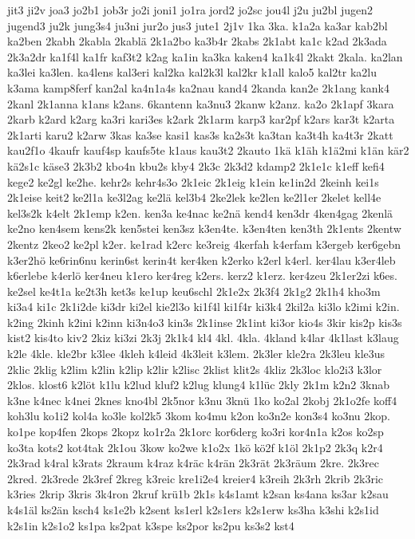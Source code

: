 {jit3
ji2v
joa3
jo2b1
job3r
jo2i
joni1
jo1ra
jord2
jo2sc
jou4l
j2u
ju2bl
jugen2
jugend3
ju2k
jung3s4
ju3ni
jur2o
jus3
jute1
2j1v
1ka
3ka.
k1a2a
ka3ar
kab2bl
ka2ben
2kabh
2kabla
2kablä
2k1a2bo
ka3b4r
2kabs
2k1abt
ka1c
k2ad
2k3ada
2k3a2dr
ka1f4l
ka1fr
kaf3t2
k2ag
ka1in
ka3ka
kaken4
ka1k4l
2kakt
2kala.
ka2lan
ka3lei
ka3len.
ka4lens
kal3eri
kal2ka
kal2k3l
kal2kr
k1all
kalo5
kal2tr
ka2lu
k3ama
kamp8ferf
kan2al
ka4n1a4s
ka2nau
kand4
2kanda
kan2e
2k1ang
kank4
2kanl
2k1anna
k1ans
k2ans.
6kantenn
ka3nu3
2kanw
k2anz.
ka2o
2k1apf
3kara
2karb
k2ard
k2arg
ka3ri
kari3es
k2ark
2k1arm
karp3
kar2pf
k2ars
kar3t
k2arta
2k1arti
karu2
k2arw
3kas
ka3se
kasi1
kas3s
ka2s3t
ka3tan
ka3t4h
ka4t3r
2katt
kau2f1o
4kaufr
kauf4sp
kaufs5te
k1aus
kau3t2
2kauto
1kä
k1äh
k1ä2mi
k1än
kär2
kä2s1c
käse3
2k3b2
kbo4n
kbu2s
kby4
2k3c
2k3d2
kdamp2
2k1e1c
k1eff
kefi4
kege2
ke2gl
ke2he.
kehr2s
kehr4s3o
2k1eic
2k1eig
k1ein
ke1in2d
2keinh
kei1s
2k1eise
keit2
ke2l1a
ke3l2ag
ke2lä
kel3b4
2ke2lek
ke2len
ke2l1er
2kelet
kell4e
kel3s2k
k4elt
2k1emp
k2en.
ken3a
ke4nac
ke2nä
kend4
ken3dr
4ken4gag
2kenlä
ke2no
ken4sem
kens2k
ken5stei
ken3sz
k3en4te.
k3en4ten
ken3th
2k1ents
2kentw
2kentz
2keo2
ke2pl
k2er.
ke1rad
k2erc
ke3reig
4kerfah
k4erfam
k3ergeb
ker6gebn
k3er2hö
ke6rin6nu
kerin6st
kerin4t
ker4ken
k2erko
k2erl
k4erl.
ker4lau
k3er4leb
k6erlebe
k4erlö
ker4neu
k1ero
ker4reg
k2ers.
kerz2
k1erz.
ker4zeu
2k1er2zi
k6es.
ke2sel
ke4t1a
ke2t3h
ket3s
ke1up
keu6schl
2k1e2x
2k3f4
2k1g2
2k1h4
kho3m
ki3a4
ki1c
2k1i2de
ki3dr
ki2el
kie2l3o
ki1f4l
ki1f4r
ki3k4
2kil2a
ki3lo
k2imi
k2in.
k2ing
2kinh
k2ini
k2inn
ki3n4o3
kin3s
2k1inse
2k1int
ki3or
kio4s
3kir
kis2p
kis3s
kist2
kis4to
kiv2
2kiz
ki3zi
2k3j
2k1k4
kl4
4kl.
4kla.
4kland
k4lar
4k1last
k3laug
k2le
4kle.
kle2br
k3lee
4kleh
k4leid
4k3leit
k3lem.
2k3ler
kle2ra
2k3leu
kle3us
2klic
2klig
k2lim
k2lin
k2lip
k2lir
k2lisc
2klist
klit2s
4kliz
2k3loc
klo2i3
k3lor
2klos.
klost6
k2löt
k1lu
k2lud
kluf2
k2lug
klung4
k1lüc
2kly
2k1m
k2n2
3knab
k3ne
k4nec
k4nei
2knes
kno4bl
2k5nor
k3nu
3knü
1ko
ko2al
2kobj
2k1o2fe
koff4
koh3lu
ko1i2
kol4a
ko3le
kol2k5
3kom
ko4mu
k2on
ko3n2e
kon3s4
ko3nu
2kop.
ko1pe
kop4fen
2kops
2kopz
ko1r2a
2k1orc
kor6derg
ko3ri
kor4n1a
k2os
ko2sp
ko3ta
kots2
kot4tak
2k1ou
3kow
ko2we
k1o2x
1kö
kö2f
k1öl
2k1p2
2k3q
k2r4
2k3rad
k4ral
k3rats
2kraum
k4raz
k4räc
k4rän
2k3rät
2k3räum
2kre.
2k3rec
2kred.
2k3rede
2k3ref
2kreg
k3reic
kre1i2e4
kreier4
k3reih
2k3rh
2krib
2k3ric
k3ries
2krip
3kris
3k4ron
2kruf
krü1b
2k1s
k4s1amt
k2san
ks4ana
ks3ar
k2sau
k4s1äl
ks2än
ksch4
ks1e2b
k2sent
ks1erl
k2s1ers
k2s1erw
ks3ha
k3shi
k2s1id
k2s1in
k2s1o2
ks1pa
ks2pat
k3spe
ks2por
ks2pu
ks3s2
kst4
}
